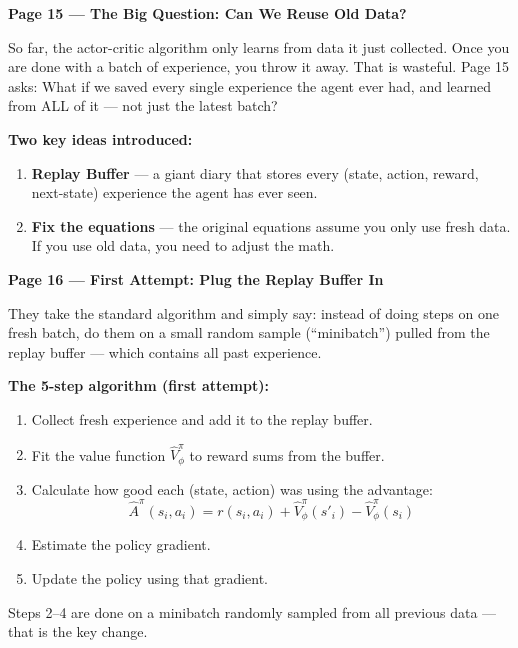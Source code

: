 \bigskip


\textbf{Page 15 --- The Big Question: Can We Reuse Old Data?}

\medskip
So far, the actor-critic algorithm only learns from data it just collected.
Once you are done with a batch of experience, you throw it away. That is wasteful.
Page 15 asks: What if we saved every single experience the agent ever had,
and learned from ALL of it --- not just the latest batch?

\medskip
\textbf{Two key ideas introduced:}
\begin{enumerate}
    \item \textbf{Replay Buffer} --- a giant diary that stores every
          (state, action, reward, next-state) experience the agent has ever seen.
    \item \textbf{Fix the equations} --- the original equations assume you only
          use fresh data. If you use old data, you need to adjust the math.
\end{enumerate}

\bigskip

\textbf{Page 16 --- First Attempt: Plug the Replay Buffer In}

\medskip
They take the standard algorithm and simply say: instead of doing steps on one
fresh batch, do them on a small random sample (``minibatch'') pulled from the
replay buffer --- which contains all past experience.

\medskip
\textbf{The 5-step algorithm (first attempt):}
\begin{enumerate}
    \item Collect fresh experience and add it to the replay buffer.
    \item Fit the value function $\hat{V}^{\pi}_{\phi}$ to reward sums from the buffer.
    \item Calculate how good each (state, action) was using the advantage:
          \[
              \hat{A}^{\pi}(s_i, a_i) = r(s_i, a_i) + \hat{V}^{\pi}_{\phi}(s'_i) - \hat{V}^{\pi}_{\phi}(s_i)
          \]
    \item Estimate the policy gradient.
    \item Update the policy using that gradient.
\end{enumerate}

Steps 2--4 are done on a minibatch randomly sampled from all previous data ---
that is the key change.

